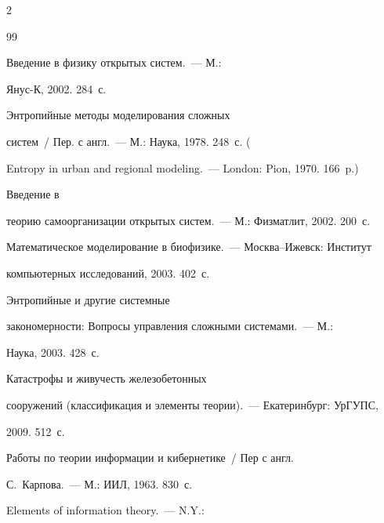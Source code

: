 \begin{multicols}{2}
{{\begin{thebibliography}{99}


   Введение в физику открытых сис\-тем.~--- М.: 

Янус-К, 2002. 284~с.


   Энтропийные методы моделирования слож\-ных 

  сис\-тем~/ Пер. с англ.~--- М.: Наука, 1978.  248~с. (

  Entropy in urban and regional modeling.~--- London: Pion, 1970. 166~p.)


   Введение в 

  тео\-рию самоорганизации открытых сис\-тем.~--- М.: Физматлит, 2002. 200~с.



Математическое моделирование в биофизике.~--- Москва--Ижевск: Институт 

компьютерных исследований, 2003. 402~с.






   Энтропийные и другие сис\-тем\-ные 

закономерности: Вопросы управ\-ле\-ния сложными сис\-те\-ма\-ми.~--- М.: 

Наука, 2003. 428~с.


   Катастрофы и живучесть железобетонных 

сооружений (классификация и элементы теории).~--- Екатеринбург: УрГУПС, 

2009. 512~с.




   Работы по теории информации и кибернетике~/ Пер с англ.

  С.~Карпова.~--- М.:    ИИЛ, 1963. 830~с.

  


   Elements of information theory.~--- N.Y.: 


\end{thebibliography}}}
\end{multicols}
